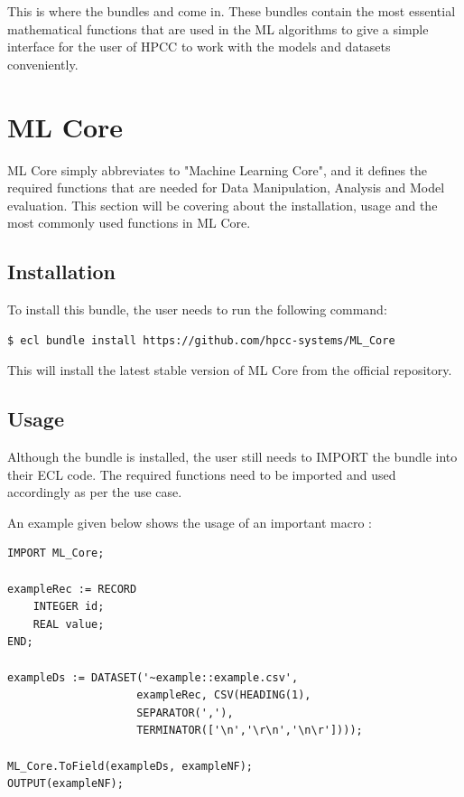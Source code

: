 \documentclass[a4paper,oneside,12pt]{book}
\begin{document}
This is where the bundles  and  come in. These bundles contain the most essential mathematical functions that are used in the ML algorithms to give a simple interface for the user of HPCC to work with the models and datasets conveniently.

\section{ML Core}\label{sec:mlcore}

ML Core simply abbreviates to "Machine Learning Core", and it defines the required functions that are needed for Data Manipulation, Analysis and Model evaluation. This section will be covering about the installation, usage and the most commonly used functions in ML Core.

\subsection{Installation}

To install this bundle, the user needs to run the following command:

\begin{lstlisting}[language=bash]
$ ecl bundle install https://github.com/hpcc-systems/ML_Core
\end{lstlisting}

This will install the latest stable version of ML Core from the official repository.

\subsection{Usage}

Although the bundle is installed, the user still needs to IMPORT the bundle into their ECL code. The required functions need to be imported and used accordingly as per the use case.

An example given below shows the usage of an important macro \textbf{}:

\begin{lstlisting}
IMPORT ML_Core;

exampleRec := RECORD
    INTEGER id;
    REAL value;
END;

exampleDs := DATASET('~example::example.csv', 
                    exampleRec, CSV(HEADING(1),
                    SEPARATOR(','),
                    TERMINATOR(['\n','\r\n','\n\r'])));

ML_Core.ToField(exampleDs, exampleNF);
OUTPUT(exampleNF);
\end{lstlisting}
\end{document}
